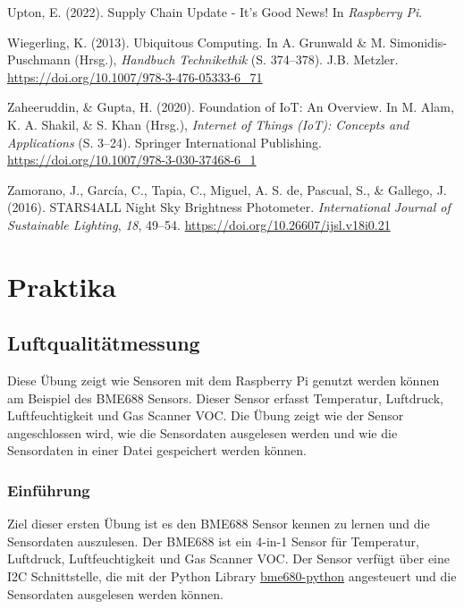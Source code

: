 \documentclass[
  11pt,
  a4paperpaper,
  oneside, openany  ,captions=tableheading
]{scrbook}
\newlength{\cslhangindent}
\newenvironment{CSLReferences}[2] %
  {\begin{list}{}{%
   \setlength{\itemindent}{0pt}
   \setlength{\leftmargin}{0pt}
   \setlength{\parsep}{0pt}
   \ifodd #1
    \setlength{\leftmargin}{\cslhangindent}
    \setlength{\itemindent}{-1\cslhangindent}
   \fi
   \setlength{\itemsep}{#2\baselineskip}}}
  {\end{list}}
\theoremstyle{definition}
\theoremstyle{remark}
\begin{document}
\begin{CSLReferences}{1}{0}
Upton, E. (2022). Supply Chain Update - It's Good News! In
\emph{Raspberry Pi}.

Wiegerling, K. (2013). {Ubiquitous Computing}. In A. Grunwald \& M.
Simonidis-Puschmann (Hrsg.), \emph{{Handbuch Technikethik}} (S.
374--378). J.B. Metzler.
\url{https://doi.org/10.1007/978-3-476-05333-6_71}

Zaheeruddin, \& Gupta, H. (2020). Foundation of {IoT}: {An Overview}. In
M. Alam, K. A. Shakil, \& S. Khan (Hrsg.), \emph{Internet of {Things}
({IoT}): {Concepts} and {Applications}} (S. 3--24). Springer
International Publishing.
\url{https://doi.org/10.1007/978-3-030-37468-6_1}

Zamorano, J., García, C., Tapia, C., Miguel, A. S. de, Pascual, S., \&
Gallego, J. (2016). {STARS4ALL Night Sky Brightness Photometer}.
\emph{International Journal of Sustainable Lighting}, \emph{18}, 49--54.
\url{https://doi.org/10.26607/ijsl.v18i0.21}

\end{CSLReferences}

\part{Praktika}

\chapter{Luftqualitätmessung}\label{luftqualituxe4tmessung}

Diese Übung zeigt wie Sensoren mit dem Raspberry Pi genutzt werden
können am Beispiel des BME688 Sensors. Dieser Sensor erfasst Temperatur,
Luftdruck, Luftfeuchtigkeit und Gas Scanner VOC. Die Übung zeigt wie der
Sensor angeschlossen wird, wie die Sensordaten ausgelesen werden und wie
die Sensordaten in einer Datei gespeichert werden können.

\hfill\break

\section{Einführung}\label{einfuxfchrung}

Ziel dieser ersten Übung ist es den BME688 Sensor kennen zu lernen und
die Sensordaten auszulesen. Der BME688 ist ein 4-in-1 Sensor für
Temperatur, Luftdruck, Luftfeuchtigkeit und Gas Scanner VOC. Der Sensor
verfügt über eine I2C Schnittstelle, die mit der Python Library
\href{https://github.com/pimoroni/bme680-python}{bme680-python}
angesteuert und die Sensordaten ausgelesen werden können.
\end{document}
